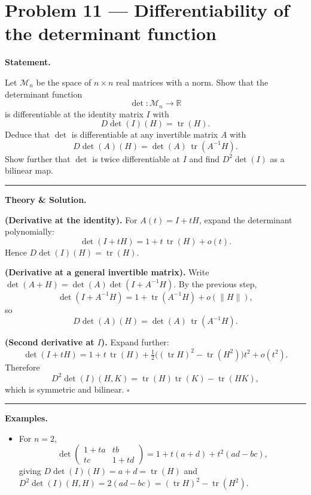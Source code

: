 \documentclass[12pt,a4paper]{article}
\theoremstyle{plain}
\theoremstyle{definition}
\theoremstyle{remark}
\theoremstyle{remark}
\newcommand{\gap}{\vspace{6pt}}
\begin{document}

\section*{Problem 11 — Differentiability of the determinant function}

\textbf{Statement.}\gap

Let $\mathcal{M}_n$ be the space of $n\times n$ real matrices with a norm.  
Show that the determinant function
\[
\det:\mathcal{M}_n \longrightarrow \mathbb{R}
\]
is differentiable at the identity matrix $I$ with
\[
D\det(I)(H)=\operatorname{tr}(H).
\]
Deduce that $\det$ is differentiable at any invertible matrix $A$ with
\[
D\det(A)(H)=\det(A)\,\operatorname{tr}(A^{-1}H).
\]
Show further that $\det$ is twice differentiable at $I$ and find $D^2\det(I)$ as a bilinear map.

\bigskip\hrule\bigskip

\textbf{Theory \& Solution.}\gap

\textbf{(Derivative at the identity).}\;
For $A(t)=I+tH$, expand the determinant polynomially:
\[
\det(I+tH)=1+t\,\operatorname{tr}(H)+o(t).
\]
Hence $D\det(I)(H)=\operatorname{tr}(H)$.

\medskip

\textbf{(Derivative at a general invertible matrix).}\;
Write $\det(A+H)=\det(A)\det(I+A^{-1}H)$.  
By the previous step,
\[
\det(I+A^{-1}H)=1+\operatorname{tr}(A^{-1}H)+o(\|H\|),
\]
so
\[
D\det(A)(H)=\det(A)\,\operatorname{tr}(A^{-1}H).
\]

\medskip

\textbf{(Second derivative at $I$).}\;
Expand further:
\[
\det(I+tH)=1+t\,\operatorname{tr}(H)
+\tfrac{1}{2}\big((\operatorname{tr}H)^2-\operatorname{tr}(H^2)\big)t^2+o(t^2).
\]
Therefore
\[
D^2\det(I)(H,K)
=\operatorname{tr}(H)\operatorname{tr}(K)-\operatorname{tr}(HK),
\]
which is symmetric and bilinear. \hfill$\square$

\bigskip\hrule\bigskip

\textbf{Examples.}\gap
\begin{itemize}\setlength{\itemsep}{6pt}
	\item For $n=2$,
	\[
	\det\!\begin{pmatrix}1+t a & t b\\ t c & 1+t d\end{pmatrix}
	=1+t(a+d)+t^2(ad-bc),
	\]
	giving $D\det(I)(H)=a+d=\operatorname{tr}(H)$ and
	$D^2\det(I)(H,H)=2(ad-bc)=(\operatorname{tr}H)^2-\operatorname{tr}(H^2)$.
\end{itemize}
\end{document}
